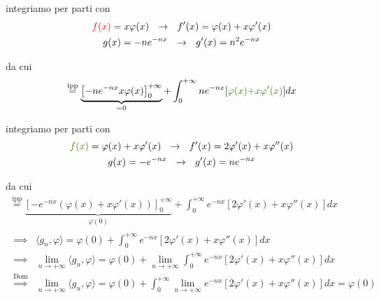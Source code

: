 \begin{enumerate}
integriamo per parti con
\begin{gather*}
\textcolor[rgb]{0.82, 0.01, 0.11}{f}\textcolor[rgb]{0.82, 0.01, 0.11}{(}\textcolor[rgb]{0.82, 0.01, 0.11}{x}\textcolor[rgb]{0.82, 0.01, 0.11}{)} = x\varphi (x) \ \ \rightarrow \ \ f'(x) = \varphi (x) + x\varphi '(x)\\
g(x) = - ne^{- nx} \ \ \rightarrow \ \ g'(x) = n^{2} e^{- nx}
\end{gather*}

da cui
\begin{equation*}
\overset{\text{ipp}}{=}\underbrace{\left[ - ne^{- nx} x\varphi (x)\right]^{+ \infty}_{0}}_{= 0} + \int^{+ \infty}_{0} ne^{- nx}[\textcolor[rgb]{0.25, 0.46, 0.02}{\varphi}\textcolor[rgb]{0.25, 0.46, 0.02}{(}\textcolor[rgb]{0.25, 0.46, 0.02}{x}\textcolor[rgb]{0.25, 0.46, 0.02}{)}\textcolor[rgb]{0.25, 0.46, 0.02}{+ x\varphi '}\textcolor[rgb]{0.25, 0.46, 0.02}{(}\textcolor[rgb]{0.25, 0.46, 0.02}{x}\textcolor[rgb]{0.25, 0.46, 0.02}{)}] dx
\end{equation*}

integriamo per parti con
\begin{gather*}
\textcolor[rgb]{0.25, 0.46, 0.02}{f}\textcolor[rgb]{0.25, 0.46, 0.02}{(}\textcolor[rgb]{0.25, 0.46, 0.02}{x}\textcolor[rgb]{0.25, 0.46, 0.02}{)} = \varphi (x) + x\varphi '(x) \ \ \rightarrow \ \ f'(x) = 2\varphi '(x) + x\varphi ''(x)\\
g(x) = - e^{- nx} \ \ \rightarrow \ \ g'(x) = ne^{- nx}
\end{gather*}

da cui
\begin{gather*}
\overset{\text{ipp}}{=}\underbrace{\left[ - e^{- nx}(\varphi (x) + x\varphi '(x))\right]^{+ \infty}_{0}}_{\varphi (0)} + \int^{+ \infty}_{0} e^{- nx}[ 2\varphi '(x) + x\varphi ''(x)] dx\\
\begin{aligned}
\implies & \langle g_{n}, \varphi \rangle = \varphi (0) + \int^{+ \infty}_{0} e^{- nx}[ 2\varphi '(x) + x\varphi ''(x)] dx\\
\implies & \lim\limits_{n\rightarrow + \infty} \langle g_{n}, \varphi \rangle = \varphi (0) + \lim\limits_{n\rightarrow + \infty}\int^{+ \infty}_{0} e^{- nx}[ 2\varphi '(x) + x\varphi ''(x)] dx\\
\overset{\text{Dom}}{\implies} & \lim\limits_{n\rightarrow + \infty} \langle g_{n}, \varphi \rangle = \varphi (0) + \int^{+ \infty}_{0}\lim\limits_{n\rightarrow + \infty} e^{- nx}[ 2\varphi '(x) + x\varphi ''(x)] dx = \varphi (0)
\end{aligned}
\end{gather*}


\end{enumerate}
